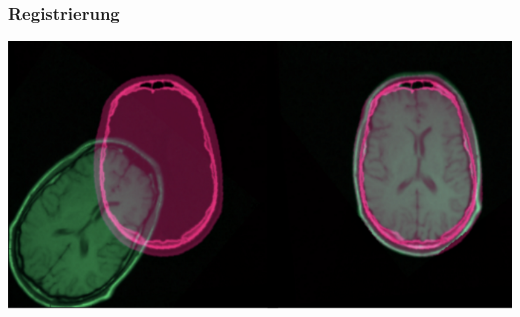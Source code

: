 %
%
%
\begin{frame}
\frametitle{Registrierung}
\begin{center}
\includegraphics[width=\textwidth]{../slides/0/registration.png}
\end{center}
\end{frame}
